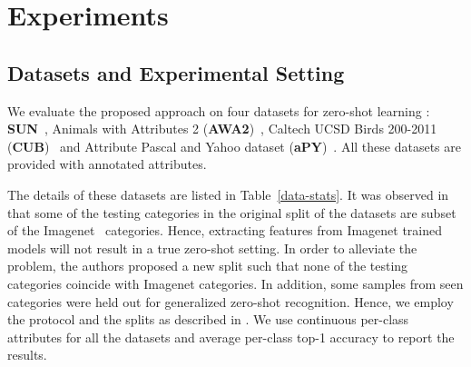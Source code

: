 \documentclass[10pt,twocolumn,letterpaper]{article}
\begin{document}
\section{Experiments}
\label{expts}

\subsection{Datasets and Experimental Setting}
We evaluate the proposed approach on four datasets for zero-shot learning : \textbf{SUN}~\cite{xiao2010sun}, Animals with Attributes 2 (\textbf{AWA2})~\cite{xian2017zero1}, Caltech UCSD Birds 200-2011 (\textbf{CUB})~\cite{wah2011caltech} and  Attribute Pascal and Yahoo dataset (\textbf{aPY})~\cite{farhadi2009describing}. All these datasets are provided with annotated attributes. 

The details of these datasets are listed in Table~\ref{data-stats}.
It was observed in \cite{Xian_2017_CVPR} that some of the testing categories in the original split of the datasets are subset of the Imagenet~\cite{deng2009imagenet} categories. Hence, extracting features from Imagenet trained models will not result in a true zero-shot setting. In order to alleviate the problem, the authors proposed a new split such that none of the testing categories coincide with Imagenet categories. In addition, some samples from seen categories were held out for generalized zero-shot recognition. 
Hence, we employ the protocol and the splits as described in \cite{Xian_2017_CVPR,xian2017zero1}.
We use continuous per-class attributes for all the datasets and average per-class top-1 accuracy to report the results.
\end{document}
